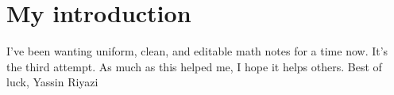\chapter*{My introduction}
    I've been wanting uniform, clean, and editable math notes for a time now. It's the third attempt.
    \newline
    \newline
    As much as this helped me, I hope it helps others.
    \newline
    \newline
    \newline
    \newline
    \newline
    Best of luck,
    \newline
    Yassin Riyazi